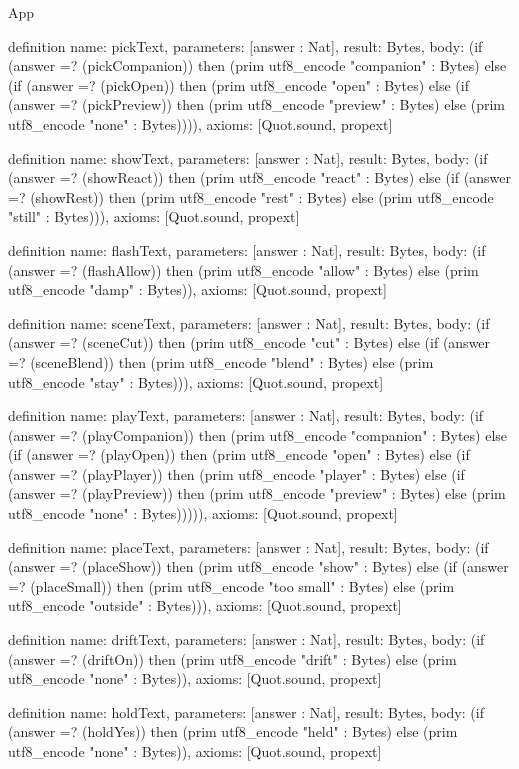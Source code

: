 \begin{lexlean}{App}
\begin{semanticmodule}
definition{
  name: pickText,
  parameters: [answer : Nat],
  result: Bytes,
  body: (if (answer =? (pickCompanion)) then (prim utf8_encode "companion" : Bytes) else (if (answer =? (pickOpen)) then (prim utf8_encode "open" : Bytes) else (if (answer =? (pickPreview)) then (prim utf8_encode "preview" : Bytes) else (prim utf8_encode "none" : Bytes)))),
  axioms: [Quot.sound, propext]
}

definition{
  name: showText,
  parameters: [answer : Nat],
  result: Bytes,
  body: (if (answer =? (showReact)) then (prim utf8_encode "react" : Bytes) else (if (answer =? (showRest)) then (prim utf8_encode "rest" : Bytes) else (prim utf8_encode "still" : Bytes))),
  axioms: [Quot.sound, propext]
}

definition{
  name: flashText,
  parameters: [answer : Nat],
  result: Bytes,
  body: (if (answer =? (flashAllow)) then (prim utf8_encode "allow" : Bytes) else (prim utf8_encode "damp" : Bytes)),
  axioms: [Quot.sound, propext]
}

definition{
  name: sceneText,
  parameters: [answer : Nat],
  result: Bytes,
  body: (if (answer =? (sceneCut)) then (prim utf8_encode "cut" : Bytes) else (if (answer =? (sceneBlend)) then (prim utf8_encode "blend" : Bytes) else (prim utf8_encode "stay" : Bytes))),
  axioms: [Quot.sound, propext]
}

definition{
  name: playText,
  parameters: [answer : Nat],
  result: Bytes,
  body: (if (answer =? (playCompanion)) then (prim utf8_encode "companion" : Bytes) else (if (answer =? (playOpen)) then (prim utf8_encode "open" : Bytes) else (if (answer =? (playPlayer)) then (prim utf8_encode "player" : Bytes) else (if (answer =? (playPreview)) then (prim utf8_encode "preview" : Bytes) else (prim utf8_encode "none" : Bytes))))),
  axioms: [Quot.sound, propext]
}

definition{
  name: placeText,
  parameters: [answer : Nat],
  result: Bytes,
  body: (if (answer =? (placeShow)) then (prim utf8_encode "show" : Bytes) else (if (answer =? (placeSmall)) then (prim utf8_encode "too small" : Bytes) else (prim utf8_encode "outside" : Bytes))),
  axioms: [Quot.sound, propext]
}

definition{
  name: driftText,
  parameters: [answer : Nat],
  result: Bytes,
  body: (if (answer =? (driftOn)) then (prim utf8_encode "drift" : Bytes) else (prim utf8_encode "none" : Bytes)),
  axioms: [Quot.sound, propext]
}

definition{
  name: holdText,
  parameters: [answer : Nat],
  result: Bytes,
  body: (if (answer =? (holdYes)) then (prim utf8_encode "held" : Bytes) else (prim utf8_encode "none" : Bytes)),
  axioms: [Quot.sound, propext]
}


\end{semanticmodule}
\end{lexlean}
